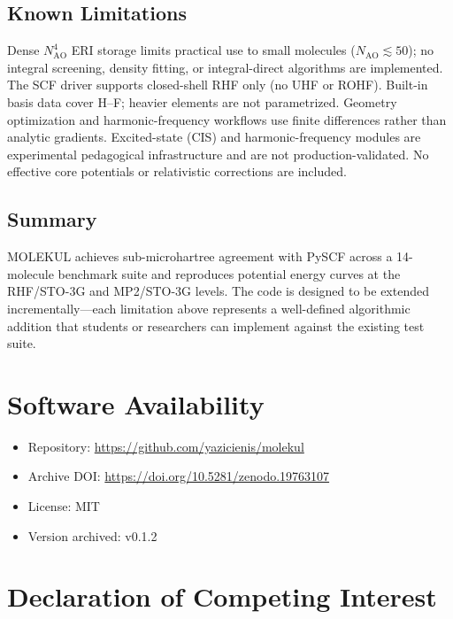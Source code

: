 \documentclass[1p,times]{elsarticle}
\begin{document}
\subsection{Known Limitations}

Dense $N_\mathrm{AO}^4$ ERI storage limits practical use to small molecules
($N_\mathrm{AO}\lesssim50$); no integral screening, density fitting, or
integral-direct algorithms are implemented.
The SCF driver supports closed-shell RHF only (no UHF or ROHF).
Built-in basis data cover H--F; heavier elements are not parametrized.
Geometry optimization and harmonic-frequency workflows use finite differences
rather than analytic gradients.
Excited-state (CIS) and harmonic-frequency modules are experimental
pedagogical infrastructure and are not production-validated.
No effective core potentials or relativistic corrections are included.

\subsection{Summary}

MOLEKUL achieves sub-microhartree agreement with PySCF across a 14-molecule
benchmark suite and reproduces potential energy curves at the RHF/STO-3G and
MP2/STO-3G levels.
The code is designed to be extended incrementally---each limitation above
represents a well-defined algorithmic addition that students or researchers can
implement against the existing test suite.

\section*{Software Availability}

\begin{itemize}
  \item Repository: \url{https://github.com/yazicienis/molekul}
  \item Archive DOI: \url{https://doi.org/10.5281/zenodo.19763107}
  \item License: MIT
  \item Version archived: v0.1.2
\end{itemize}

\section*{Declaration of Competing Interest}
\end{document}
